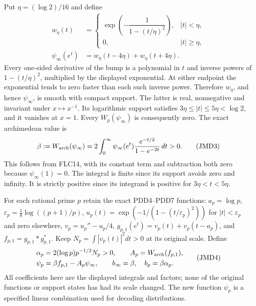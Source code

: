 \documentclass[11pt]{article}
\begin{document}
Put $\eta=(\log2)/16$ and define
\[
\begin{split}
w_\eta(t)&=
\begin{cases}
\exp\!\left(-\dfrac{1}{1-(t/\eta)^2}\right),&|t|<\eta,\\
0,&|t|\ge\eta,
\end{cases}\\
\psi_\infty(e^t)&=w_\eta(t-4\eta)+w_\eta(t+4\eta).
\end{split}
\tag{JMD2}
\]
Every one-sided derivative of the bump is a polynomial in $t$ and
inverse powers of $1-(t/\eta)^2$, multiplied by the displayed
exponential. At either endpoint the exponential tends to zero faster
than each such inverse power. Therefore $w_\eta$, and hence
$\psi_\infty$, is smooth with compact support.
The latter is real, nonnegative and invariant under $x\mapsto x^{-1}$.
Its logarithmic support satisfies
$3\eta\le|t|\le5\eta<\log2$, and it vanishes at $x=1$.
Every $W_p(\psi_\infty)$ is consequently zero.
The exact archimedean value is
\[
\beta:=W_{\rm arch}(\psi_\infty)
=2\int_0^\infty
\psi_\infty(e^t)\frac{e^{-t/2}}{1-e^{-2t}}\,dt>0.
\tag{JMD3}
\]
This follows from FLC14, with its constant term and subtraction both
zero because $\psi_\infty(1)=0$.
The integral is finite since its support avoids zero and infinity.
It is strictly positive since its integrand is positive for
$3\eta<t<5\eta$.

For each rational prime $p$ retain the exact PDD4--PDD7 functions:
$a_p=\log p$, $\varepsilon_p=\frac18\log((p+1)/p)$,
$u_p(t)=\exp(-1/(1-(t/\varepsilon_p)^2))$ for
$|t|<\varepsilon_p$ and zero elsewhere,
$v_p=u_p''-u_p/4$,
$g_{p,1}(e^t)=v_p(t)+v_p(t-a_p)$, and
$f_{p,1}=g_{p,1}*g_{p,1}^*$.
Keep $N_p=\int|v_p(t)|^2dt>0$ at its original scale.
Define
\[
\begin{split}
\alpha_p&=2(\log p)p^{-1/2}N_p>0,\qquad
A_p=W_{\rm arch}(f_{p,1}),\\
\psi_p&=\beta f_{p,1}-A_p\psi_\infty,\qquad
b_\infty=\beta,\quad b_p=\beta\alpha_p.
\end{split}
\tag{JMD4}
\]
All coefficients here are the displayed integrals and factors;
none of the original functions or support states has had its scale
changed. The new function $\psi_p$ is a specified linear combination
used for decoding distributions.
\end{document}
